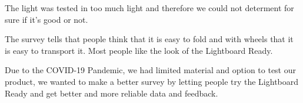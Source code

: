 \documentclass[a4paper]{jpconf}
\begin{document}
The light was tested in too much light and therefore we could not determent for sure if it's good or not.



The survey tells that people think that it is easy to fold and with wheels that it is easy to transport it. 
Most people like the look of the Lightboard Ready.

Due to the COVID-19 Pandemic, we had limited material and option to test our product, we wanted to make a better survey by letting people try the Lightboard Ready and get better and more reliable data and feedback.

	
\clearpage
\appendix
\end{document}
